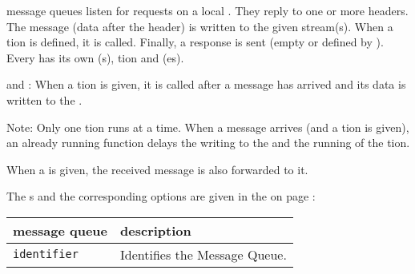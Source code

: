 \REPLY{} message queues listen for requests on a local \PORT.
They reply to one or more headers.
The message (data after the header) is written to the given \REQUEST{} stream(s).
When a \FUNC tion is defined, it is called.
Finally, a response is sent (empty or defined by \RESPONSE{}).
Every \HEADER{} has its own \REQUEST (s), \FUNC tion and \RESPONSE (es).

\SUBSCRIBE{} and \REPLY: When a \FUNC tion is given, it is called after a message has arrived and its data is written
to the \DATAPOOL.

Note: Only one \FUNC tion runs at a time. When a message arrives (and a \FUNC tion is given), an already running function
delays the writing to the \DATAPOOL{} and the running of the \FUNC tion.

When a \PLUGIN{} is given, the received message is also forwarded to it.

The \HEADER s and the corresponding options are given in the
 on page \pageref{dia:opmessagequeueheaderoption}:



\begin{tabularx}{\textwidth}{l|X}
message queue & description \\
\hline
\verb+identifier+ & Identifies the Message Queue. \\
\end{tabularx}



